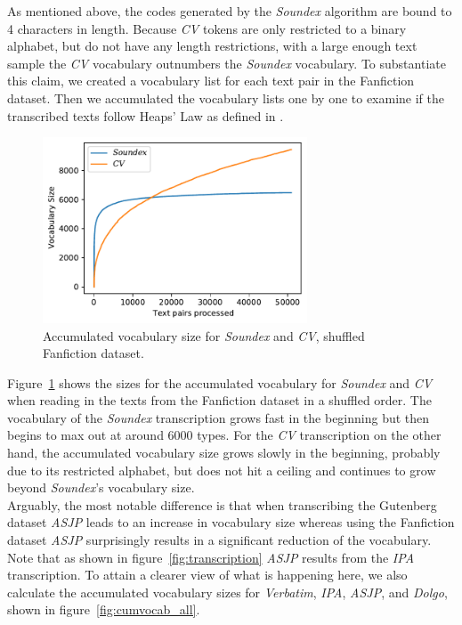 As mentioned above, the codes generated by the \textit{Soundex} algorithm are bound to 4 characters in length.
Because \textit{CV} tokens are only restricted to a binary alphabet, but do not have any length restrictions, with a large enough text sample the \textit{CV} vocabulary outnumbers the \textit{Soundex} vocabulary.
To substantiate this claim, we created a vocabulary list for each text pair in the Fanfiction dataset.
Then we accumulated the vocabulary lists one by one to examine if the transcribed texts follow Heaps' Law as defined in \cite{schutze2008introduction}.
\begin{figure}
  \centering
  \includegraphics[width=0.7\textwidth]{figures/cum_vocab_size_ff_shuffled_soundexcv}
  \caption{Accumulated vocabulary size for \textit{Soundex} and \textit{CV}, shuffled Fanfiction dataset.}
  \label{fig:cumvocab_soundexcv}
\end{figure}
Figure~\ref{fig:cumvocab_soundexcv} shows the sizes for the accumulated vocabulary for \textit{Soundex} and \textit{CV} when reading in the texts from the Fanfiction dataset in a shuffled order.
The vocabulary of the \textit{Soundex} transcription grows fast in the beginning but then begins to max out at around 6000 types.
For the \textit{CV} transcription on the other hand, the accumulated vocabulary size grows slowly in the beginning, probably due to its restricted alphabet, but does not hit a ceiling and continues to grow beyond \textit{Soundex}'s vocabulary size.\\
Arguably, the most notable difference is that when transcribing the Gutenberg dataset \textit{ASJP} leads to an increase in vocabulary size whereas using the Fanfiction dataset \textit{ASJP} surprisingly results in a significant reduction of the vocabulary.
Note that as shown in figure~\ref{fig:transcription} \textit{ASJP} results from the \textit{IPA} transcription.
To attain a clearer view of what is happening here, we also calculate the accumulated vocabulary sizes for \textit{Verbatim}, \textit{IPA}, \textit{ASJP}, and \textit{Dolgo}, shown in figure~\ref{fig:cumvocab_all}.
